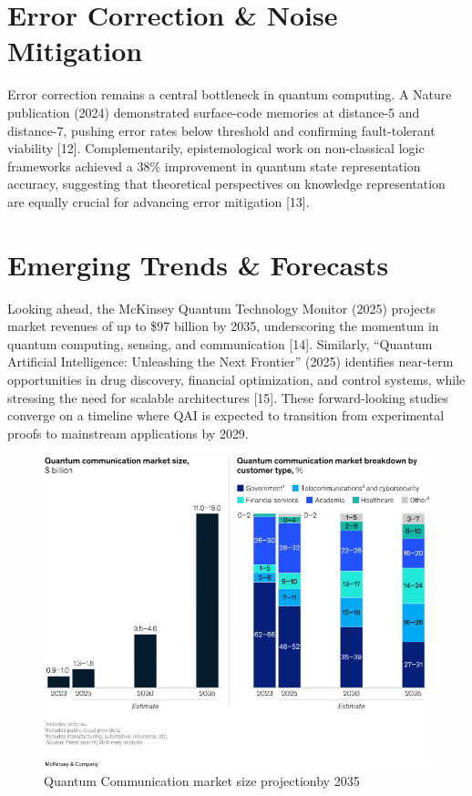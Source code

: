\section{Error Correction \& Noise Mitigation}
\hspace*{0.3in}Error correction remains a central bottleneck in quantum computing. A Nature publication (2024) demonstrated surface-code memories at distance-5 and distance-7, pushing error rates below threshold and confirming fault-tolerant viability [12]. Complementarily, epistemological work on non-classical logic frameworks achieved a 38\% improvement in quantum state representation accuracy, suggesting that theoretical perspectives on knowledge representation are equally crucial for advancing error mitigation [13].
\section{Emerging Trends \& Forecasts}
\hspace*{0.3in}Looking ahead, the McKinsey Quantum Technology Monitor (2025) projects market revenues of up to \$97 billion by 2035, underscoring the momentum in quantum computing, sensing, and communication [14]. Similarly, “Quantum Artificial Intelligence: Unleashing the Next Frontier” (2025) identifies near-term opportunities in drug discovery, financial optimization, and control systems, while stressing the need for scalable architectures [15]. These forward-looking studies converge on a timeline where QAI is expected to transition from experimental proofs to mainstream applications by 2029.
\begin{figure}[htbp]
	\centering
	\includegraphics[width=0.9\linewidth]{qt351.png}
	\caption{Quantum Communication market size projectionby 2035}
	\label{fig:enter-label}
\end{figure}